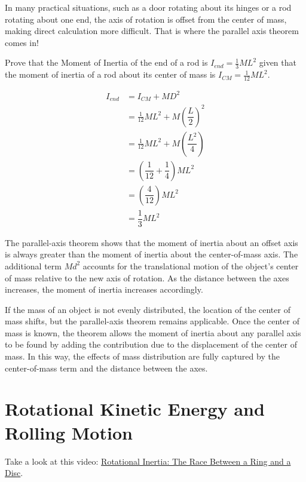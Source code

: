 In many practical situations, such as a door rotating about its hinges or a rod rotating about one end, the axis of rotation is offset from the center of mass, making direct calculation more difficult. That is where the parallel axis theorem comes in!

\begin{Exercise}[title=Parallel Axis Theorem, label=parallelAxisThm1]
Prove that the Moment of Inertia of the end of a rod is $I_{end} = \frac{1}{3}ML^2$ given that the moment of inertia of a rod about its center of mass is $I_{CM} = \frac{1}{12}ML^2$.
\end{Exercise}
\begin{Answer}[ref=parallelAxisThm1]
\begin{align*}
  I_{end} &= I_{CM} + MD^2 \\
          &= \frac{1}{12}ML^2 + M\left( \dfrac{L}{2} \right)^2\\
          &= \frac{1}{12}ML^2 + M\left( \dfrac{L^2}{4} \right) \\ 
          &= \left(  \dfrac{1}{12} + \dfrac{1}{4}  \right)ML^2 \\
          &= \left(  \dfrac{4}{12}  \right) ML^2\\
          &= \dfrac{1}{3} ML^2
\end{align*}
\end{Answer}

The parallel-axis theorem shows that the moment of inertia about an offset axis is always greater than the moment of inertia about the center-of-mass axis. The additional term $Md^2$ accounts for the translational motion of the object's center of mass relative to the new axis of rotation. As the distance between the axes increases, the moment of inertia increases accordingly.

If the mass of an object is not evenly distributed, the location of the center of mass shifts, but the parallel-axis theorem remains applicable. Once the center of mass is known, the theorem allows the moment of inertia about any parallel axis to be found by adding the contribution due to the displacement of the center of mass. In this way, the effects of mass distribution are fully captured by the center-of-mass term and the distance between the axes.


\section{Rotational Kinetic Energy and Rolling Motion}
Take a look at this video: \href{https://www.youtube.com/watch?v=CHQOctEvtTY}{Rotational Inertia: The Race Between a Ring and a Disc}.

